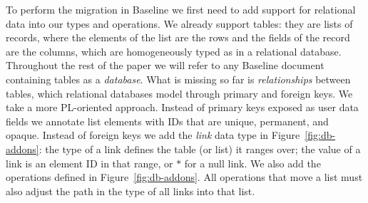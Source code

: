 \documentclass[english,submission]{programming}
\theoremstyle{definition}
\newcommand{\mathbox}[1]{\colorbox{black!10}{$#1$\phantom{i\hspace{-3.5pt}}}}
\begin{document}
To perform the migration in Baseline we first need to add support for relational data into our types and operations.
We already support tables: they are lists of records, where the elements of the list are the rows and the fields of the record are the columns, which are homogeneously typed as in a relational database.
Throughout the rest of the paper we will refer to any Baseline document containing tables as a \textit{database}.
What is missing so far is \textit{relationships} between tables, which relational databases model through primary and foreign keys. We take a more PL-oriented approach.
Instead of primary keys exposed as user data fields we annotate list elements with IDs that are unique, permanent, and opaque. Instead of foreign keys we add the \textit{link} data type in Figure~\ref{fig:db-addons}: the type of a link defines the table (or list) it ranges over; the value of a link is an element ID in that range, or \mathbox{*} for a null link. We also add the operations defined in Figure~\ref{fig:db-addons}. All operations that move a list must also adjust the path in the type of all links into that list.
\end{document}
